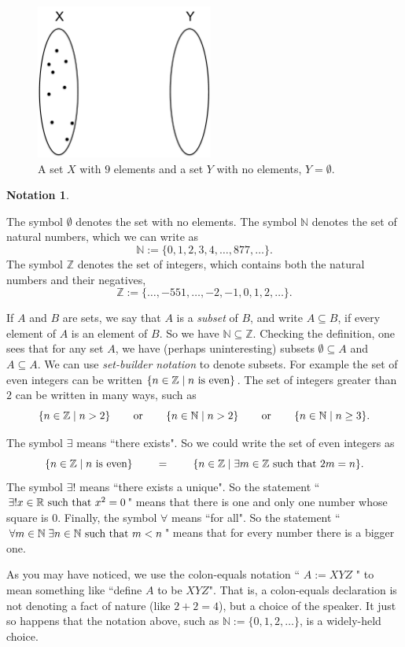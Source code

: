 \documentclass{book}
\def\tn{\textnormal}
\def\ZZ{{\mathbb Z}}
\def\RR{{\mathbb R}}
\def\NN{{\mathbb N}}
\def\hsp{\hspace{.3in}}
\def\ss{\subseteq}
\def\|{{\;|\;}}
\theoremstyle{remark}
\theoremstyle{definition}
\newtheorem{notation}[subsubsection]{Notation}
\begin{document}
\begin{figure}
\begin{center}
\includegraphics[height=2in]{aSet}
\end{center}
\caption{A set $X$ with $9$ elements and a set $Y$ with no elements, $Y=\emptyset$.}
\end{figure}

\begin{notation}\label{not:basic math notation}

The symbol $\emptyset$ denotes the set with no elements. The symbol $\NN$\index{a symbol!$\NN$} denotes the set of natural numbers, which we can write as 
$$\NN:=\{0,1,2,3,4,\ldots,877,\ldots\}.$$
The symbol $\ZZ$\index{a symbol!$\ZZ$} denotes the set of integers, which contains both the natural numbers and their negatives, 
$$\ZZ:=\{\ldots,-551,\ldots,-2,-1,0,1,2,\ldots\}.$$ 

If $A$ and $B$ are sets, we say that $A$ is a {\em subset} of $B$, and write $A\ss B$, if every element of $A$ is an element of $B$. So we have $\NN\ss\ZZ$. Checking the definition, one sees that for any set $A$, we have (perhaps uninteresting) subsets $\emptyset\ss A$ and $A\ss A$. We can use {\em set-builder notation} to denote subsets. For example the set of even integers can be written $\{n\in\ZZ\|n\tn{ is even}\}$. The set of integers greater than $2$ can be written in many ways, such as $$\{n\in\ZZ\|n>2\} \hsp\tn{or}\hsp\{n\in\NN\|n>2\}\hsp\tn{or}\hsp\{n\in\NN\|n\geq 3\}.$$

The symbol $\exists$ means ``there exists". So we could write the set of even integers as $$\{n\in\ZZ\|n\tn{ is even}\}\hsp=\hsp\{n\in\ZZ\|\exists m\in\ZZ\tn{ such that } 2m=n\}.$$ The symbol $\exists!$ means ``there exists a unique". So the statement ``$\exists! x\in\RR\tn{ such that } x^2=0$" means that there is one and only one number whose square is 0. Finally, the symbol $\forall$ means ``for all". So the statement ``$\forall m\in\NN\;\exists n\in\NN\tn{ such that } m<n$" means that for every number there is a bigger one.

As you may have noticed, we use the colon-equals notation `` $A:=XYZ$ " to mean something like ``define $A$ to be $XYZ$". That is, a colon-equals declaration is not denoting a fact of nature (like $2+2=4$), but a choice of the speaker. It just so happens that the notation above, such as $\NN:=\{0,1,2,\ldots\}$, is a widely-held choice.

\end{notation}
\end{document}
